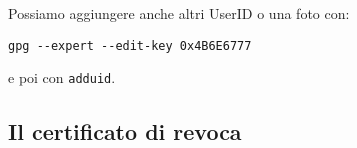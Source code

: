 \documentclass[a4paper,10pt]{article}
\begin{document}
Possiamo aggiungere anche altri UserID o una foto con:

\begin{verbatim}
gpg --expert --edit-key 0x4B6E6777
\end{verbatim}

e poi con \texttt{adduid}.

\subsection{Il certificato di revoca}
\end{document}
